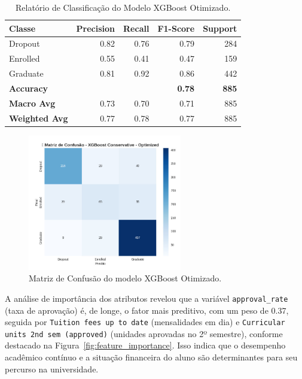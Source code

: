 \documentclass[12pt]{article}
\begin{document}
\begin{table}[h!]
\centering
\caption{Relatório de Classificação do Modelo XGBoost Otimizado.}
\label{tab:class_report}
\begin{tabular}{lrrrr}
\toprule
\textbf{Classe} & \textbf{Precision} & \textbf{Recall} & \textbf{F1-Score} & \textbf{Support} \\
\midrule
Dropout    & 0.82 & 0.76 & 0.79 & 284 \\
Enrolled   & 0.55 & 0.41 & 0.47 & 159 \\
Graduate   & 0.81 & 0.92 & 0.86 & 442 \\
\midrule
\textbf{Accuracy} & & & \textbf{0.78} & \textbf{885} \\
\textbf{Macro Avg} & 0.73 & 0.70 & 0.71 & 885 \\
\textbf{Weighted Avg} & 0.77 & 0.78 & 0.77 & 885 \\
\bottomrule
\end{tabular}
\end{table}

\clearpage

\begin{figure}[h!]
\centering
\includegraphics[width=0.6\textwidth]{images/matriz_confusao.jpg}
\caption{Matriz de Confusão do modelo XGBoost Otimizado.}
\label{fig:matriz_confusao}
\end{figure}

A análise de importância dos atributos revelou que a variável \texttt{approval\_rate} (taxa de aprovação) é, de longe, o fator mais preditivo, com um peso de 0.37, seguida por \texttt{Tuition fees up to date} (mensalidades em dia) e \texttt{Curricular units 2nd sem (approved)} (unidades aprovadas no 2º semestre), conforme destacado na Figura~\ref{fig:feature_importance}. Isso indica que o desempenho acadêmico contínuo e a situação financeira do aluno são determinantes para seu percurso na universidade.
\end{document}
